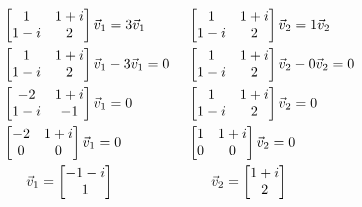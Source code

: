 \documentclass{article}
\theoremstyle{plain}
\begin{document}
\begin{align*}
&\begin{bmatrix}1 & 1+i\\1-i & 2\end{bmatrix}\vec{v}_1             = 3 \vec{v}_1 & \hspace{1mm} &\begin{bmatrix}1 & 1+i\\1-i & 2\end{bmatrix} \vec{v}_2=1\vec{v}_2 \\
&\begin{bmatrix}1 & 1+i\\1-i & 2\end{bmatrix}\vec{v}_1-3\vec{v}_1 = 0           & \hspace{1mm} &\begin{bmatrix}1 & 1+i\\1-i & 2\end{bmatrix}         \vec{v}_2-0\vec{v}_2=0\\
&\begin{bmatrix}-2 & 1+i\\1-i & -1\end{bmatrix}\vec{v}_1          = 0           & \hspace{1mm} &\begin{bmatrix}1 & 1+i\\1-i & 2\end{bmatrix} \vec{v}_2 = 0 \\
&\begin{bmatrix}-2 & 1+i\\0 & 0\end{bmatrix}\vec{v}_1          = 0              & \hspace{1mm} &\begin{bmatrix}1 & 1+i\\0 & 0\end{bmatrix} \vec{v}_2 = 0 \\
& \hspace{6mm} \vec{v}_1            =\begin{bmatrix}-1-i\\1\end{bmatrix}           & \hspace{1mm} &\hspace{6mm} \vec{v}_2    =\begin{bmatrix}1+i\\2\end{bmatrix} 
\end{align*}
\end{document}

